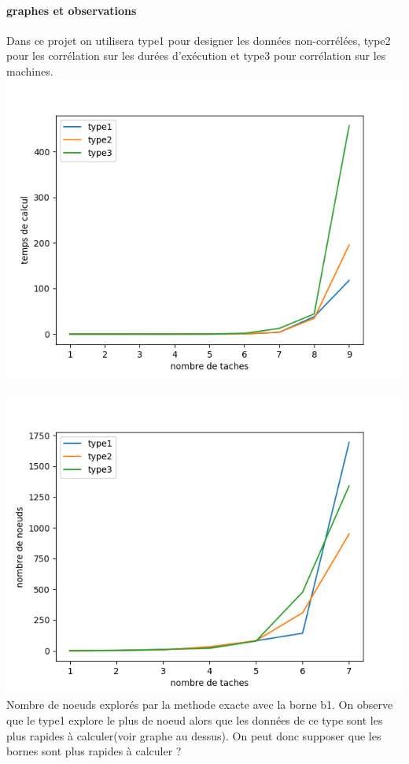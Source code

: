 \documentclass[a4paper, 10pt]{article}
\begin{document}
                \paragraph{graphes et observations}{

                  Dans ce projet on utilisera type1 pour designer les données non-corrélées, type2 pour les corrélation sur les durées d'exécution et type3 pour corrélation sur les machines.\\

                  \includegraphics{graphes/exacte_b1.png}
                  
                  
                }
                \paragraph{}{
                  \includegraphics{graphes/node_b1.png}
                  Nombre de noeuds explorés par la methode exacte avec la borne b1. On observe que le type1 explore le plus de noeud alors que les données de ce type sont les plus rapides à calculer(voir graphe au dessus).
                  On peut donc supposer que les bornes sont plus rapides à calculer ?
                }
\end{document}
